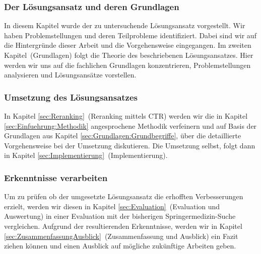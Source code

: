 \subsubsection{Der Lösungsansatz und deren Grundlagen}
\label{sec:Einfuehrung:GliederungAufbau:Loesungsansatz}

In diesem Kapitel wurde der zu untersuchende Lösungsansatz vorgestellt. Wir haben Problemstellungen und deren Teilprobleme identifiziert. Dabei sind wir auf die Hintergründe dieser Arbeit und die Vorgehensweise eingegangen. Im zweiten Kapitel~(Grundlagen) folgt die Theorie des beschriebenen Lösungsansatzes. Hier werden wir uns auf die fachlichen Grundlagen konzentrieren, Problemstellungen analysieren und Lösungsansätze vorstellen.

\subsubsection{Umsetzung des Lösungsansatzes}
\label{sec:Einfuehrung:GliederungAufbau:Umsetzung}

In Kapitel \ref{sec:Reranking}~(Reranking mittels CTR) werden wir die in Kapitel \ref{sec:Einfuehrung:Methodik} angesprochene Methodik verfeinern und auf Basis der Grundlagen aus Kapitel \ref{sec:Grundlagen:Grundbegriffe}, über die detaillierte Vorgehensweise bei der Umsetzung diskutieren. Die Umsetzung selbst, folgt dann in Kapitel \ref{sec:Implementierung}~(Implementierung).

\subsubsection{Erkenntnisse verarbeiten}
\label{sec:Einfuehrung:GliederungAufbau:Erkenntnisse}

Um zu prüfen ob der umgesetzte Lösungsansatz die erhofften Verbesserungen erzielt, werden wir diesen in Kapitel \ref{sec:Evaluation}~(Evaluation und Auswertung) in einer Evaluation mit der bisherigen Springermedizin-Suche vergleichen. Aufgrund der resultierenden Erkenntnisse, werden wir in Kapitel \ref{sec:ZusammenfassungAusblick}~(Zusammenfassung und Ausblick) ein Fazit ziehen können und einen Ausblick auf mögliche zukünftige Arbeiten geben.